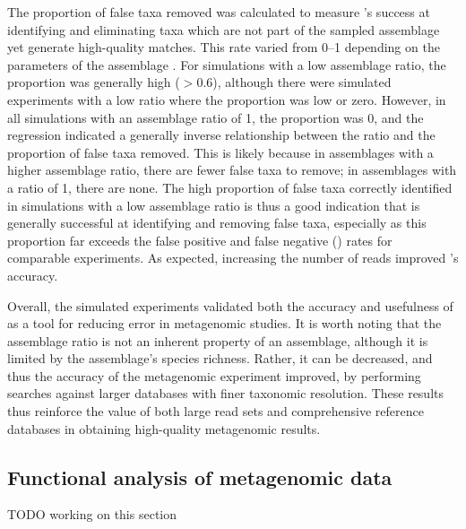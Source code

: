 The proportion of false taxa removed was calculated to measure 's success at identifying and eliminating taxa which are not part of the sampled assemblage yet generate high-quality  matches.
This rate varied from 0--1 depending on the parameters of the assemblage .
For simulations with a low assemblage ratio, the proportion was generally high ($> 0.6$), although there were simulated experiments with a low ratio where the proportion was low or zero.
However, in all simulations with an assemblage ratio of 1, the proportion was 0, and the regression indicated a generally inverse relationship between the ratio and the proportion of false taxa removed.
This is likely because in assemblages with a higher assemblage ratio, there are fewer false taxa to remove; in assemblages with a ratio of 1, there are none.
The high proportion of false taxa correctly identified in simulations with a low assemblage ratio is thus a good indication that  is generally successful at identifying and removing false taxa, especially as this proportion far exceeds the false positive and false negative () rates for comparable experiments.
As expected, increasing the number of reads improved 's accuracy.

Overall, the simulated experiments validated both the accuracy and usefulness of  as a tool for reducing error in metagenomic studies.
It is worth noting that the assemblage ratio is not an inherent property of an assemblage, although it is limited by the assemblage's species richness.
Rather, it can be decreased, and thus the accuracy of the metagenomic experiment improved, by performing  searches against larger databases with finer taxonomic resolution.
These results thus reinforce the value of both large read sets and comprehensive reference databases in obtaining high-quality metagenomic results.

\subsection{Functional analysis of metagenomic data}

TODO working on this section

